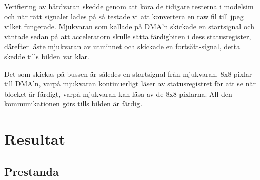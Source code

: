 \documentclass[a4paper]{article}
\begin{document}
Verifiering av hårdvaran skedde genom att köra de tidigare testerna i modelsim och när rätt signaler lades på så testade vi att konvertera en raw fil till jpeg vilket fungerade. Mjukvaran som kallade på DMA\rq{}n skickade en startsignal och väntade sedan på att acceleratorn skulle sätta färdigbiten i dess statusregister, därefter läste mjukvaran av utminnet och skickade en fortsätt-signal, detta skedde tills bilden var klar. 

Det som skickas på bussen är således en startsignal från mjukvaran, 8x8 pixlar till DMA\rq{}n, varpå mjukvaran kontinuerligt läser av statusregistret för att se när blocket är färdigt, varpå mjukvaran kan läsa av de 8x8 pixlarna. All den kommunikationen görs tills bilden är färdig.

\section{Resultat}

\subsection{Prestanda}
\end{document}
